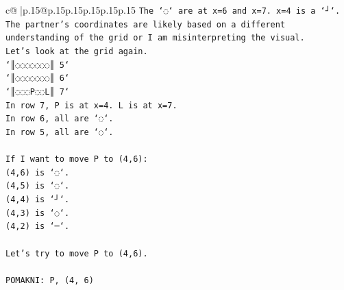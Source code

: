 \documentclass{article}
\begin{document}
{\begin{supertabular}{c@{$\;$}|p{.15\linewidth}@{}p{.15\linewidth}p{.15\linewidth}p{.15\linewidth}p{.15\linewidth}p{.15\linewidth}}
{{{\texttt{The `◌` are at x=6 and x=7. x=4 is a `┘`.} \\
\texttt{The partner's coordinates are likely based on a different understanding of the grid or I am misinterpreting the visual.} \\
\texttt{Let's look at the grid again.} \\
\texttt{`║◌◌◌◌◌◌◌║ 5`} \\
\texttt{`║◌◌◌◌◌◌◌║ 6`} \\
\texttt{`║◌◌◌P◌◌L║ 7`} \\
\texttt{In row 7, P is at x=4. L is at x=7.} \\
\texttt{In row 6, all are `◌`.} \\
\texttt{In row 5, all are `◌`.} \\
\\ 
\texttt{If I want to move P to (4,6):} \\
\texttt{(4,6) is `◌`.} \\
\texttt{(4,5) is `◌`.} \\
\texttt{(4,4) is `┘`.} \\
\texttt{(4,3) is `◌`.} \\
\texttt{(4,2) is `─`.} \\
\\ 
\texttt{Let's try to move P to (4,6).} \\
\\ 
\texttt{POMAKNI: P, (4, 6)} \\
            }
        }
    }
     \\ \\


\end{supertabular}}
\end{document}
